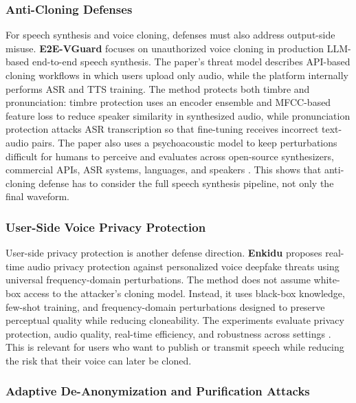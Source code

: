 \subsubsection{Anti-Cloning Defenses}

For speech synthesis and voice cloning, defenses must also address output-side misuse. \textbf{E2E-VGuard} focuses on unauthorized voice cloning in production LLM-based end-to-end speech synthesis. The paper's threat model describes API-based cloning workflows in which users upload only audio, while the platform internally performs ASR and TTS training. The method protects both timbre and pronunciation: timbre protection uses an encoder ensemble and MFCC-based feature loss to reduce speaker similarity in synthesized audio, while pronunciation protection attacks ASR transcription so that fine-tuning receives incorrect text-audio pairs. The paper also uses a psychoacoustic model to keep perturbations difficult for humans to perceive and evaluates across open-source synthesizers, commercial APIs, ASR systems, languages, and speakers \citep{zhang2025e2evguardadversarialpreventionproduction}. This shows that anti-cloning defense has to consider the full speech synthesis pipeline, not only the final waveform.

\subsubsection{User-Side Voice Privacy Protection}

User-side privacy protection is another defense direction. \textbf{Enkidu} proposes real-time audio privacy protection against personalized voice deepfake threats using universal frequency-domain perturbations. The method does not assume white-box access to the attacker's cloning model. Instead, it uses black-box knowledge, few-shot training, and frequency-domain perturbations designed to preserve perceptual quality while reducing cloneability. The experiments evaluate privacy protection, audio quality, real-time efficiency, and robustness across settings \citep{feng2025enkiduuniversalfrequentialperturbation}. This is relevant for users who want to publish or transmit speech while reducing the risk that their voice can later be cloned.

\subsubsection{Adaptive De-Anonymization and Purification Attacks}

